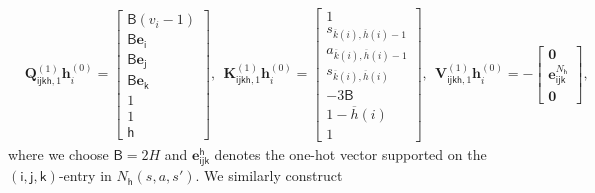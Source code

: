 \documentclass[10pt]{article}
\renewcommand{\bar}{\overline}
\newcommand{\<}{\left\langle}
\renewcommand{\>}{\right\rangle}
\renewcommand{\bQ}{\mathbf{Q}}
\newcommand{\bzero}{{\mathbf 0}}
\newcommand{\state}{{s}}
\newcommand{\action}{{a}}
\newcommand{\horizon}{{H}}
\renewcommand{\horizon}{{H}}
\newcommand{\tfthres}{{\mathsf{B}}}
\newcommand{\Numvi}{{N}}
\newcommand{\oddeven}{{v}}
\def\bK{{\mathbf K}}
\def\bQ{{\mathbf Q}}
\def\bV{{\mathbf V}}
\def\be{{\mathbf e}}
\def\bh{{\mathbf h}}
\def\si{{\mathsf{i}}}
\def\sj{{\mathsf{j}}}
\def\sk{{\mathsf{k}}}
\def\sh{{\mathsf{h}}}
\begin{document}
\begin{align*}
&\bQ^{(1)}_{\si\sj\sk\sh,1}\bh^{(0)}_{i}=
\begin{bmatrix}
\tfthres(\oddeven_i-1)\\
        \tfthres\be_\si\\
         \tfthres\be_\sj\\
          \tfthres\be_\sk\\
          1\\
          1\\
         \sh
    \end{bmatrix},~~ \bK^{(1)}_{\si\sj\sk\sh,1}\bh^{(0)}_{i}=\begin{bmatrix}1\\
     \state_{\bar{k}(i),\bar{h}(i)-1}\\
        \action_{\bar{k}(i),\bar{h}(i)-1}\\
         \state_{\bar{k}(i),\bar{h}(i)}\\
        -3\tfthres\\
        1- \bar{h}(i)\\
        1
\end{bmatrix},~~ \bV^{(1)}_{\si\sj\sk\sh,1}\bh^{(0)}_{i}=-
\begin{bmatrix}
\bzero\\\be^{\Numvi_\sh}_{\si\sj\sk}
\\\bzero\end{bmatrix},
\end{align*}
where we choose $\tfthres=2\horizon$ and $\be_{\si\sj\sk}^\sh$ denotes the one-hot vector supported on the $(\si,\sj,\sk)$-entry in $\Numvi_\sh(\state,\action,\state')$.
We similarly construct
\end{document}
